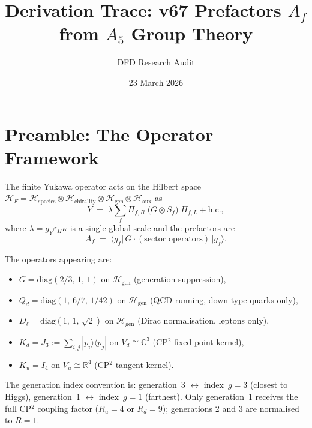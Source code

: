 \documentclass[11pt]{article}
\title{Derivation Trace: v67 Prefactors $A_f$ from $A_5$ Group Theory}
\author{DFD Research Audit}
\date{23 March 2026}
\theoremstyle{remark}
\begin{document}
\maketitle

\tableofcontents
\newpage

\section{Preamble: The Operator Framework}

The finite Yukawa operator acts on the Hilbert space
$\mathcal{H}_F = \mathcal{H}_{\mathrm{species}} \otimes \mathcal{H}_{\mathrm{chirality}} \otimes \mathcal{H}_{\mathrm{gen}} \otimes \mathcal{H}_{\mathrm{aux}}$
as
\begin{equation}\label{eq:Yukawa}
Y \;=\; \lambda \sum_f \Pi_{f,R}\;\bigl(G \otimes S_f\bigr)\;\Pi_{f,L} + \mathrm{h.c.},
\end{equation}
where $\lambda = g_Y \varepsilon_H \kappa$ is a single global scale and the prefactors are
\begin{equation}\label{eq:Af}
A_f \;=\; \langle g_f | \, G \cdot (\text{sector operators}) \, | g_f \rangle.
\end{equation}

The operators appearing are:
\begin{itemize}[nosep]
  \item $G = \mathrm{diag}(2/3,\,1,\,1)$ on $\mathcal{H}_{\mathrm{gen}}$ \quad (generation suppression),
  \item $Q_d = \mathrm{diag}(1,\,6/7,\,1/42)$ on $\mathcal{H}_{\mathrm{gen}}$ \quad (QCD running, down-type quarks only),
  \item $D_\ell = \mathrm{diag}(1,\,1,\,\sqrt{2})$ on $\mathcal{H}_{\mathrm{gen}}$ \quad (Dirac normalisation, leptons only),
  \item $K_d = J_3 := \sum_{i,j}|p_i\rangle\langle p_j|$ on $V_d \cong \mathbb{C}^3$ \quad (CP$^2$ fixed-point kernel),
  \item $K_u = I_4$ on $V_u \cong \mathbb{R}^4$ \quad (CP$^2$ tangent kernel).
\end{itemize}

The generation index convention is: generation~3 $\leftrightarrow$ index~$g=3$ (closest to Higgs), generation~1 $\leftrightarrow$ index~$g=1$ (farthest).  Only generation~1 receives the full CP$^2$ coupling factor ($R_u = 4$ or $R_d = 9$); generations 2 and 3 are normalised to $R = 1$.
\end{document}

